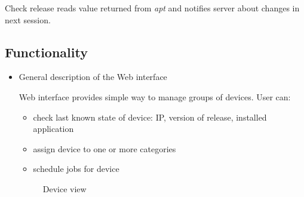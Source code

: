 Check release reads value returned from \emph{apt} and notifies server about changes in next session.

\subsection{Functionality}

\begin{itemize}
  \item General description of the Web interface

Web interface provides simple way to manage groups of devices. User can:
\begin{itemize}
  \item check last known state of device: IP, version of release, installed application
  \item assign device to one or more categories
  \item schedule jobs for device
\end{itemize}

\begin{figure}[htbp]
  \centering
    \caption{Device view}
\end{figure}


\end{itemize}
